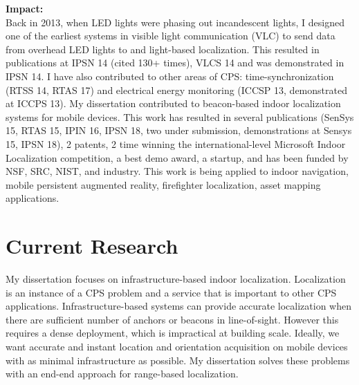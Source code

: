 \documentclass[10pt]{article}
\begin{document}

\textbf{Impact:}\\
Back in 2013, when LED lights were phasing out incandescent lights, I designed one of the earliest systems in visible light communication (VLC) to send data from overhead LED lights to and light-based localization. This resulted in publications at IPSN 14 (cited 130+ times), VLCS 14 and was demonstrated in IPSN 14. I have also contributed to other areas of CPS: time-synchronization (RTSS 14, RTAS 17) and electrical energy monitoring (ICCSP 13, demonstrated at ICCPS 13). My dissertation contributed to beacon-based indoor localization systems for mobile devices. This work has resulted in several publications (SenSys 15, RTAS 15, IPIN 16, IPSN 18, two under submission, demonstrations at Sensys 15, IPSN 18), 2 patents, 2 time winning the international-level Microsoft Indoor Localization competition, a best demo award, a startup, and has been funded by NSF, SRC, NIST, and industry. This work is being applied to indoor navigation, mobile persistent augmented reality, firefighter localization, asset mapping applications. 

\section{Current Research}

My dissertation focuses on infrastructure-based indoor localization. Localization is an instance of a CPS problem and a service that is important to other CPS applications. Infrastructure-based systems can provide accurate localization when there are sufficient number of anchors or beacons in line-of-sight. However this requires a dense deployment, which is impractical at building scale. Ideally, we want accurate and instant location and orientation acquisition on mobile devices with as minimal infrastructure as possible. My dissertation solves these problems with an end-end approach for range-based localization.\\

\end{document}
